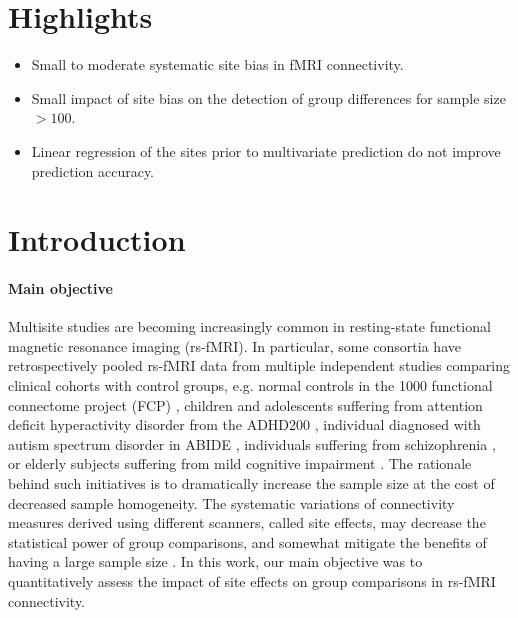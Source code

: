 \documentclass[authoryear]{elsarticle}
\begin{document}
\section*{Highlights}

\begin{itemize}
\item Small to moderate systematic site bias in fMRI connectivity.
\item Small impact of site bias on the detection of group differences for sample size $>100$.
\item Linear regression of the sites prior to multivariate prediction do not improve prediction accuracy.
\end{itemize}

\section{Introduction}

\paragraph{Main objective}
Multisite studies are becoming increasingly common in resting-state functional
magnetic resonance imaging (rs-fMRI). In particular, some consortia have
retrospectively pooled rs-fMRI data from multiple independent studies comparing
clinical cohorts with control groups, e.g. normal controls in the 1000
functional connectome project (FCP) \citep{Biswal2010}, children and adolescents
suffering from attention deficit hyperactivity disorder from the ADHD200
\citep{ADHD200,Fair2012}, individual diagnosed with autism spectrum disorder in
ABIDE \citep{Nielsen2013}, individuals suffering from schizophrenia
\citep{Cheng2015}, or elderly subjects suffering from mild cognitive impairment
\citep{Tam2015}. The rationale behind such initiatives is to dramatically
increase the sample size at the cost of decreased sample homogeneity. The
systematic variations of connectivity measures derived using different scanners,
called site effects, may decrease the statistical power of group comparisons,
and somewhat mitigate the benefits of having a large sample size
\cite{Brown2011,Jovicich2016}. In this work, our main objective was to
quantitatively assess the impact of site effects on group comparisons in rs-fMRI
connectivity.
\end{document}

